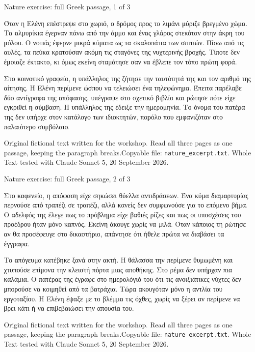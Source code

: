 \documentclass[aspectratio=169,10pt]{beamer}
\newcommand{\source}[1]{\vfill{\scriptsize\color{slate}#1\par}}
\begin{document}
\begin{frame}{Nature exercise: full Greek passage, 1 of 3}
\normalsize\raggedright\setlength{\parskip}{5pt}
Όταν η Ελένη επέστρεψε στο χωριό, ο δρόμος προς το λιμάνι μύριζε βρεγμένο χώμα. Τα αλμυρίκια έγερναν πάνω από την άμμο και ένας γλάρος στεκόταν στην άκρη του μόλου. Ο νοτιάς έφερνε μικρά κύματα ως τα σκαλοπάτια των σπιτιών. Πίσω από τις αυλές, τα πεύκα κρατούσαν ακόμη τις σταγόνες της νυχτερινής βροχής. Τίποτε δεν έμοιαζε έκτακτο, κι όμως εκείνη σταμάτησε σαν να έβλεπε τον τόπο πρώτη φορά.

Στο κοινοτικό γραφείο, η υπάλληλος της ζήτησε την ταυτότητά της και τον αριθμό της αίτησης. Η Ελένη περίμενε ώσπου να τελειώσει ένα τηλεφώνημα. Έπειτα παρέλαβε δύο αντίγραφα της απόφασης, υπέγραψε στο σχετικό βιβλίο και ρώτησε πότε είχε εγκριθεί η σύμβαση. Η υπάλληλος της έδειξε την ημερομηνία. Το όνομα του πατέρα της δεν υπήρχε στον κατάλογο των ιδιοκτητών, παρόλο που εμφανιζόταν στο παλαιότερο συμβόλαιο.
\source{Original fictional text written for the workshop. Read all three pages as one passage, keeping the paragraph breaks.\newline Copyable file: \texttt{nature\_excerpt.txt}. Whole Text tested with Claude Sonnet 5, 20 September 2026.}
\end{frame}

\begin{frame}{Nature exercise: full Greek passage, 2 of 3}
\normalsize\raggedright\setlength{\parskip}{5pt}
Στο καφενείο, η απόφαση είχε σηκώσει θύελλα αντιδράσεων. Ένα κύμα διαμαρτυρίας περνούσε από τραπέζι σε τραπέζι, αλλά κανείς δεν συμφωνούσε για το επόμενο βήμα. Ο αδελφός της έλεγε πως το πρόβλημα είχε βαθιές ρίζες και πως οι υποσχέσεις του προέδρου ήταν μόνο καπνός. Εκείνη άκουγε χωρίς να μιλά. Όταν κάποιος τη ρώτησε αν θα προσέφευγε στο δικαστήριο, απάντησε ότι ήθελε πρώτα να διαβάσει τα έγγραφα.

Το απόγευμα κατέβηκε ξανά στην ακτή. Η θάλασσα την περίμενε θυμωμένη και χτυπούσε επίμονα την κλειστή πόρτα μιας αποθήκης. Στο ρέμα δεν υπήρχαν πια καλάμια. Ο πατέρας της έγραφε στο ημερολόγιό του ότι τις ανοιξιάτικες νύχτες δεν μπορούσε να κοιμηθεί από τα βατράχια. Τώρα ακουγόταν μόνο η αντλία του εργοταξίου. Η Ελένη έψαξε με το βλέμμα τις όχθες, χωρίς να ξέρει αν περίμενε να βρει κάτι ή να επιβεβαιώσει την απουσία του.
\source{Original fictional text written for the workshop. Read all three pages as one passage, keeping the paragraph breaks.\newline Copyable file: \texttt{nature\_excerpt.txt}. Whole Text tested with Claude Sonnet 5, 20 September 2026.}
\end{frame}
\end{document}
